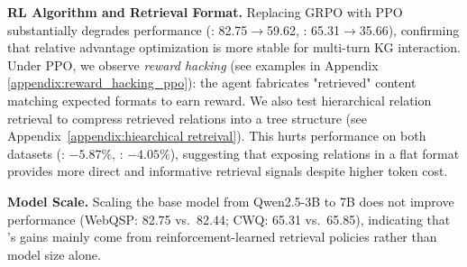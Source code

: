 \noindent\textbf{RL Algorithm and Retrieval Format.}
Replacing GRPO with PPO~\citep{ouyang2022traininglanguagemodelsfollow} substantially degrades performance (: 82.75$\rightarrow$59.62, : 65.31$\rightarrow$35.66), confirming that relative advantage optimization is more stable for multi-turn KG interaction. Under PPO, we observe \emph{reward hacking} (see examples in Appendix \ref{appendix:reward_hacking_ppo}): the agent fabricates "retrieved" content matching expected formats to earn reward. We also test hierarchical relation retrieval to compress retrieved relations into a tree structure (see Appendix~\ref{appendix:hiearchical retreival}). This hurts performance on both datasets (: $-5.87\%$, : $-4.05\%$), suggesting that exposing relations in a flat format provides more direct and informative retrieval signals despite higher token cost.



\noindent \textbf{Model Scale.} Scaling the base model from Qwen2.5-3B to 7B does not improve performance (WebQSP: 82.75 vs.\ 82.44; CWQ: 65.31 vs.\ 65.85), indicating that \framework{}'s gains mainly come from reinforcement-learned retrieval policies rather than model size alone.

